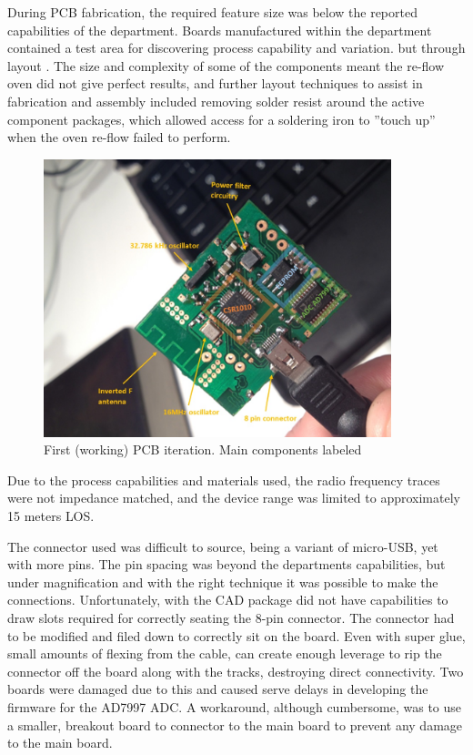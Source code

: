 \documentclass[]{article}
\begin{document}
During \ac{PCB} fabrication, the required feature size was below the reported capabilities of the department. Boards manufactured within the department contained a test area for discovering process capability and variation.  but through layout . The size and complexity of some of the components meant the re-flow oven did not give perfect results, and further layout techniques to assist in fabrication and assembly included removing solder resist around the active component packages, which allowed access for a soldering iron to ''touch up'' when the oven re-flow failed to perform. 

\begin{figure}[h]
	\begin{center}
		\includegraphics[width = 0.9\textwidth]{pcb1.jpg}
	\end{center}
	\caption{First (working) PCB iteration. Main components labeled}
	\label{fig:pcb1.jpg}
\end{figure}

Due to the process capabilities and materials used, the radio frequency traces were not impedance matched, and the device range was limited to approximately 15 meters \ac{LOS}. 

The connector used was difficult to source, being a variant of micro-USB, yet with more pins. The pin spacing was beyond the departments capabilities, but under magnification and with the right technique it was possible to make the connections. Unfortunately, with the \ac{CAD} package did not have capabilities to draw slots required for correctly seating the 8-pin connector. The connector had to be modified and filed down to correctly sit on the board. Even with super glue, small amounts of flexing from the cable, can create enough leverage to rip the connector off the board along with the tracks, destroying direct connectivity. Two boards were damaged due to this and caused serve delays in developing the firmware for the AD7997 \ac{ADC}. A workaround, although cumbersome, was to use a smaller, breakout board to connector to the main board to prevent any damage to the main board. 
\end{document}
